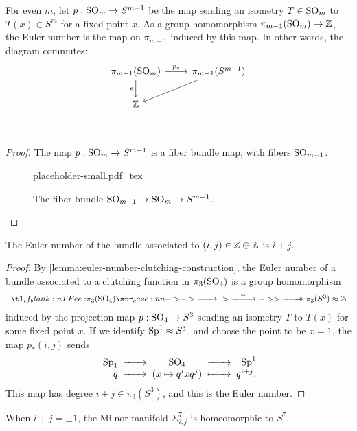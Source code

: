 \begin{lemma}\label{lemma:euler-number-clutching-construction}
	For even $m$, let
	$p : \mathrm{SO}_m \to S^{m-1}$ be the map sending an isometry $T\in \mathrm{SO}_m$ to $T(x)\in S^m$ for a fixed point $x$. As a group homomorphism $\pi_{m-1}(\mathrm{SO}_m)\to \mathbb{Z}$, the Euler number is the map on $\pi_{m-1}$ induced by this map. In other words, the diagram commutes:
	\[
		\begin{tikzcd}
			\pi_{m-1}(\SO_m) & \pi_{m-1}(S^{m-1})\\
			\Z &\\
			\arrow["e"', from=1-1, to=2-1]
			\arrow["p_*", from=1-1, to=1-2]
			\arrow[from=1-2, to=2-1]
		\end{tikzcd}
	\]
\end{lemma}
\begin{proof}
	The map $p : \mathrm{SO}_m \to S^{m-1}$ is a fiber bundle map, with fibers $\mathrm{SO}_{m-1}$.
	\begin{figure}[ht]
		\centering
		{placeholder-small.pdf_tex}
		\caption{The fiber bundle $\mathrm{SO}_{m-1}\to \mathrm{SO}_m \to S^{m-1}$.}
	\end{figure}
\end{proof}

\begin{proposition}\label{prop:euler-number-of-milnor-manifold}
	The Euler number of the bundle associated to $(i,j)\in \mathbb{Z}\oplus \mathbb{Z}$ is $i+j$.
\end{proposition}
\begin{proof}
	By \cref{lemma:euler-number-clutching-construction}, the Euler number of a bundle associated to a clutching function in $\pi_3(\mathrm{SO}_4)$ is a group homomorphism
	\[
		\lkxfunc{e}{\pi_3(\SO_4)}{\pi_3(S^3)\cong \Z}
	\]
	induced by the projection map $p : \mathrm{SO}_4 \to S^3$ sending an isometry $T$ to $T(x)$ for some fixed point $x$.
	If we identify $\mathrm{Sp}^1\approx S^3$, and choose the point to be $x=1$, the map $p_*(i,j)$ sends
	\[
		\begin{array}{r@{\;}c@{\;}c@{\;}r@{\;}r@{\;}r}
			\Sp_1 & \lkxto     & \SO_4              & \lkxto     & \Sp^1    \\
			q     & \lkxmapsto & (x\mapsto q^ixq^j) & \lkxmapsto & q^{i+j}.
		\end{array}
	\]
	This map has degree $i+j\in\pi_3(S^3)$, and this is the Euler number.
\end{proof}

\begin{proposition}\label{prop:milnor-spheres-homeomorphic-to-spheres}
	When $i+j=\pm 1$, the Milnor manifold $\Sigma_{i,j}^7$ is homeomorphic to $S^7$.
\end{proposition}

